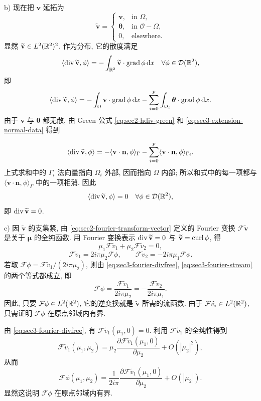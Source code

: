 \begin{Proof}
b) 现在把 $\mathbf v$ 延拓为
\[
  \widetilde{\mathbf v}=\begin{cases}
  \mathbf v,&\text{in }\Omega,\\
  \boldsymbol\theta,&\text{in }\mathcal O-\Omega,\\
  0,&\text{elsewhere}.
  \end{cases}
\]
显然 $\widetilde{\mathbf v}\in L^2(\mathbb{R}^2)^2$. 作为分布, 它的散度满足
\[
  \langle\operatorname{div}\widetilde{\mathbf v},\phi\rangle
  =-\int_{\mathbb{R}^2}\widetilde{\mathbf v}\cdot\operatorname{grad}\phi\,\mathrm{d} x
  \quad\forall\phi\in\mathcal{D}(\mathbb{R}^2),
\]
即
\[
  \langle\operatorname{div}\widetilde{\mathbf v},\phi\rangle
  =-\int_\Omega\mathbf v\cdot\operatorname{grad}\phi\,\mathrm{d} x
  -\sum_{i=0}^{p}\int_{\Omega_i}\boldsymbol\theta\cdot\operatorname{grad}\phi\,\mathrm{d} x.
\]
由于 $\mathbf v$ 与 $\boldsymbol\theta$ 都无散, 由 Green 公式
\eqref{eq:sec2-hdiv-green} 和 \eqref{eq:sec3-extension-normal-data} 得到

\[
  \langle\operatorname{div}\widetilde{\mathbf v},\phi\rangle
  =-\langle\mathbf v\cdot\mathbf n,\phi\rangle_\Gamma
  -\sum_{i=0}^{p}\langle\mathbf v\cdot\mathbf n,\phi\rangle_{\Gamma_i}.
\]
上式求和中的 $\Gamma_i$ 法向量指向 $\Omega_i$ 外部, 因而指向 $\Omega$ 内部;
所以和式中的每一项都与 $\langle\mathbf v\cdot\mathbf n,\phi\rangle_\Gamma$
中的一项相消. 因此
\[
  \langle\operatorname{div}\widetilde{\mathbf v},\phi\rangle=0
  \quad\forall\phi\in\mathcal{D}(\mathbb{R}^2),
\]
即 $\operatorname{div}\widetilde{\mathbf v}=0$.

c) 因 $\widetilde{\mathbf v}$ 的支集紧, 由 \eqref{eq:sec2-fourier-transform-vector}
定义的 Fourier 变换 $\mathcal F\widetilde{\mathbf v}$ 是关于 $\boldsymbol\mu$ 的全纯函数.
用 Fourier 变换表示 $\operatorname{div}\widetilde{\mathbf v}=0$ 与
$\widetilde{\mathbf v}=\operatorname{curl}\phi$, 得
\begin{equation}\label{eq:sec3-fourier-divfree}
  \mu_1\mathcal F\widetilde v_1+
  \mu_2\mathcal F\widetilde v_2=0,
\end{equation}
\begin{equation}\label{eq:sec3-fourier-stream}
  \mathcal F\widetilde v_1=2i\pi\mu_2\mathcal F\phi,
  \qquad
  \mathcal F\widetilde v_2=-2i\pi\mu_1\mathcal F\phi.
\end{equation}
若取 $\mathcal F\phi=\mathcal F\widetilde v_1/(2i\pi\mu_2)$, 则由
\eqref{eq:sec3-fourier-divfree}, \eqref{eq:sec3-fourier-stream} 的两个等式都成立, 即
\[
  \mathcal F\phi=\frac{\mathcal F\widetilde v_1}{2i\pi\mu_2}
  =-\frac{\mathcal F\widetilde v_2}{2i\pi\mu_1}.
\]
因此, 只要 $\mathcal F\phi\in L^2(\mathbb{R}^2)$, 它的逆变换就是
$\widetilde{\mathbf v}$ 所需的流函数. 由于
$\mathcal F\widetilde v_i\in L^2(\mathbb{R}^2)$, 只需证明
$\mathcal F\phi$ 在原点邻域内有界.

由 \eqref{eq:sec3-fourier-divfree}, 有
$\mathcal F\widetilde v_1(\mu_1,0)=0$. 利用
$\mathcal F\widetilde v_1$ 的全纯性得到
\[
  \mathcal F\widetilde v_1(\mu_1,\mu_2)
  =\mu_2\frac{\partial\mathcal F\widetilde v_1(\mu_1,0)}{\partial\mu_2}
  +O(|\mu_2|^2),
\]
从而
\[
  \mathcal F\phi(\mu_1,\mu_2)
  =\frac1{2i\pi}\frac{\partial\mathcal F\widetilde v_1(\mu_1,0)}{\partial\mu_2}
  +O(|\mu_2|).
\]
显然这说明 $\mathcal F\phi$ 在原点邻域内有界.
\end{Proof}

